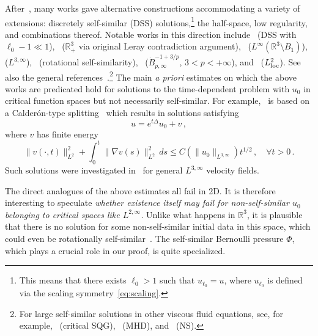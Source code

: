 \documentclass[12pt,reqno]{amsart}
\theoremstyle{plain}
\theoremstyle{definition}
\newcommand{\R}{\mathbb{R}}
\renewcommand{\:}{\colon}
\numberwithin{equation}{section}
\numberwithin{figure}{section}
\begin{document}
After~\cite{jiasverakselfsim}, many works gave alternative constructions accommodating a variety of extensions: discretely self-similar (DSS) solutions,\footnote{This means that there exists $\ell_0 > 1$ such that $u_{\ell_0} = u$, where $u_{\ell_0}$ is defined via the scaling symmetry~\eqref{eq:scaling}.} the half-space, low regularity, and combinations thereof. Notable works in this direction include~\cite{tsaidiscretely} (DSS with $\ell_0 - 1 \ll 1$),~\cite{korobkovtsai} ($\R^3_+$ via original Leray contradiction argument),~\cite{lemarie2016} ($L^\infty(\R^3 \setminus B_1)$),~\cite{bradshawtsaiII} ($L^{3,\infty}$),~\cite{bradshawtsairot} (rotational self-similarity),~\cite{bradshawtsaibesov,globalweakbesov} ($\dot B^{-1+3/p}_{p,\infty}$, $3 < p <+\infty$), and~\cite{ChaeWolfDiscretelySelfSimilar,BradshawTsaiL2Loc} ($L^2_{\rm loc}$). See also the general references~\cite{JiaSverakTsaiHandbook,BradshawTsaiSurveyRecentResults}.\footnote{For large self-similar solutions in other viscous fluid equations, see, for example,~\cite{AlbrittonBradshawSQG} (critical SQG),~\cite{LaiMHDSelfSim} (MHD), and~\cite{LaiMiaoZhengSelfsimFractional} (NS).} The main \emph{a priori} estimates on which the above works are predicated hold for solutions to the time-dependent problem with $u_0$ in critical function spaces but not necessarily self-similar. For example,~\cite{bradshawtsaiII} is based on a Calder{\'o}n-type splitting~\cite{CalderonWeakSolutionsLp} which results in solutions satisfying
\begin{equation}
    u = e^{t\Delta} u_0 + v \, ,
\end{equation}
where $v$ has finite energy
\begin{equation}
    \| v(\cdot,t) \|_{L^2}^2 + \int_0^t \| \nabla v(s) \|_{L^2}^2 \, ds \leq C(\| u_0 \|_{L^{3,\infty}}) t^{1/2} \, , \quad \forall t > 0 \, .
\end{equation}
Such solutions were investigated in~\cite{BarkerSereginSverakWeakL3} for general $L^{3,\infty}$ velocity fields.

The direct analogues of the above estimates all fail in 2D. It is therefore interesting to speculate \emph{whether existence itself may fail for non-self-similar $u_0$ belonging to critical spaces like $L^{2,\infty}$.} Unlike what happens in $\R^{3}$, it is plausible that there
is no solution for some non-self-similar initial data in this space, which could even be rotationally self-similar~\cite{bradshawtsairot}. The self-similar Bernoulli pressure $\Phi$, which plays a crucial role in our proof, is quite specialized.
\end{document}
